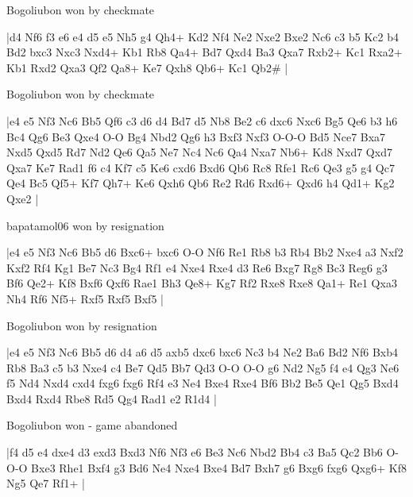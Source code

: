 \showboard

Bogoliubon won by checkmate

\makegametitle
|d4 Nf6 f3 e6 e4 d5 e5 Nh5 g4 Qh4+ Kd2 Nf4 Ne2 Nxe2 Bxe2 Nc6 c3 b5 Kc2 b4 Bd2 bxc3 Nxc3 Nxd4+ Kb1 Rb8 Qa4+ Bd7 Qxd4 Ba3 Qxa7 Rxb2+ Kc1 Rxa2+ Kb1 Rxd2 Qxa3 Qf2 Qa8+ Ke7 Qxh8 Qb6+ Kc1 Qb2\#  |

\showboard

Bogoliubon won by checkmate

\makegametitle
|e4 e5 Nf3 Nc6 Bb5 Qf6 c3 d6 d4 Bd7 d5 Nb8 Be2 c6 dxc6 Nxc6 Bg5 Qe6 b3 h6 Bc4 Qg6 Be3 Qxe4 O-O Bg4 Nbd2 Qg6 h3 Bxf3 Nxf3 O-O-O Bd5 Nce7 Bxa7 Nxd5 Qxd5 Rd7 Nd2 Qe6 Qa5 Ne7 Nc4 Nc6 Qa4 Nxa7 Nb6+ Kd8 Nxd7 Qxd7 Qxa7 Ke7 Rad1 f6 c4 Kf7 c5 Ke6 cxd6 Bxd6 Qb6 Rc8 Rfe1 Rc6 Qe3 g5 g4 Qc7 Qe4 Bc5 Qf5+ Kf7 Qh7+ Ke6 Qxh6 Qb6 Re2 Rd6 Rxd6+ Qxd6 h4 Qd1+ Kg2 Qxe2  |

\showboard

bapatamol06 won by resignation

\makegametitle
|e4 e5 Nf3 Nc6 Bb5 d6 Bxc6+ bxc6 O-O Nf6 Re1 Rb8 b3 Rb4 Bb2 Nxe4 a3 Nxf2 Kxf2 Rf4 Kg1 Be7 Nc3 Bg4 Rf1 e4 Nxe4 Rxe4 d3 Re6 Bxg7 Rg8 Bc3 Reg6 g3 Bf6 Qe2+ Kf8 Bxf6 Qxf6 Rae1 Bh3 Qe8+ Kg7 Rf2 Rxe8 Rxe8 Qa1+ Re1 Qxa3 Nh4 Rf6 Nf5+ Rxf5 Rxf5 Bxf5  |

\showboard

Bogoliubon won by resignation

\makegametitle
|e4 e5 Nf3 Nc6 Bb5 d6 d4 a6 d5 axb5 dxc6 bxc6 Nc3 b4 Ne2 Ba6 Bd2 Nf6 Bxb4 Rb8 Ba3 c5 b3 Nxe4 c4 Be7 Qd5 Bb7 Qd3 O-O O-O g6 Nd2 Ng5 f4 e4 Qg3 Ne6 f5 Nd4 Nxd4 cxd4 fxg6 fxg6 Rf4 e3 Ne4 Bxe4 Rxe4 Bf6 Bb2 Be5 Qe1 Qg5 Bxd4 Bxd4 Rxd4 Rbe8 Rd5 Qg4 Rad1 e2 R1d4  |

\showboard

Bogoliubon won - game abandoned

\makegametitle
|f4 d5 e4 dxe4 d3 exd3 Bxd3 Nf6 Nf3 e6 Be3 Nc6 Nbd2 Bb4 c3 Ba5 Qc2 Bb6 O-O-O Bxe3 Rhe1 Bxf4 g3 Bd6 Ne4 Nxe4 Bxe4 Bd7 Bxh7 g6 Bxg6 fxg6 Qxg6+ Kf8 Ng5 Qe7 Rf1+  |

\showboard

